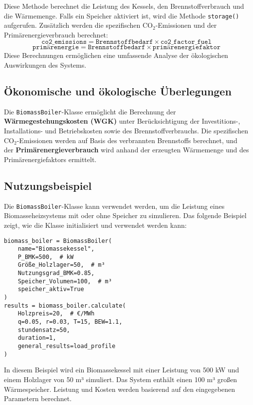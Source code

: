 \begin{itemize}
    Diese Methode berechnet die Leistung des Kessels, den Brennstoffverbrauch und die Wärmemenge. Falls ein Speicher aktiviert ist, wird die Methode \texttt{storage()} aufgerufen. Zusätzlich werden die spezifischen CO$_2$-Emissionen und der Primärenergieverbrauch berechnet:
    \[
    \texttt{co2\_emissions} = \texttt{Brennstoffbedarf} \times \texttt{co2\_factor\_fuel}
    \]
    \[
    \texttt{primärenergie} = \texttt{Brennstoffbedarf} \times \texttt{primärenergiefaktor}
    \]
    Diese Berechnungen ermöglichen eine umfassende Analyse der ökologischen Auswirkungen des Systems.
\end{itemize}

\subsection{Ökonomische und ökologische Überlegungen}
Die \texttt{BiomassBoiler}-Klasse ermöglicht die Berechnung der \textbf{Wärmegestehungskosten (WGK)} unter Berücksichtigung der Investitions-, Installations- und Betriebskosten sowie des Brennstoffverbrauchs. Die spezifischen CO$_2$-Emissionen werden auf Basis des verbrannten Brennstoffs berechnet, und der \textbf{Primärenergieverbrauch} wird anhand der erzeugten Wärmemenge und des Primärenergiefaktors ermittelt.

\subsection{Nutzungsbeispiel}
Die \texttt{BiomassBoiler}-Klasse kann verwendet werden, um die Leistung eines Biomasseheizsystems mit oder ohne Speicher zu simulieren. Das folgende Beispiel zeigt, wie die Klasse initialisiert und verwendet werden kann:

\begin{verbatim}
biomass_boiler = BiomassBoiler(
    name="Biomassekessel",
    P_BMK=500,  # kW
    Größe_Holzlager=50,  # m³
    Nutzungsgrad_BMK=0.85,
    Speicher_Volumen=100,  # m³
    speicher_aktiv=True
)
results = biomass_boiler.calculate(
    Holzpreis=20,  # €/MWh
    q=0.05, r=0.03, T=15, BEW=1.1, 
    stundensatz=50, 
    duration=1, 
    general_results=load_profile
)
\end{verbatim}
In diesem Beispiel wird ein Biomassekessel mit einer Leistung von 500 kW und einem Holzlager von 50 m³ simuliert. Das System enthält einen 100 m³ großen Wärmespeicher. Leistung und Kosten werden basierend auf den eingegebenen Parametern berechnet.